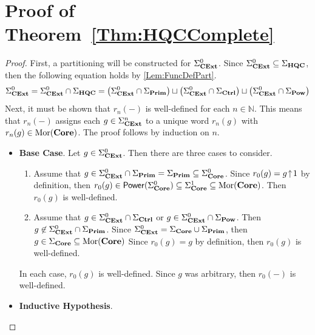 \section{Proof of Theorem~\ref{Thm:HQCComplete}}

\begin{proof}
    First, a partitioning will be constructed for $\Sigma_{\mathbf{CExt}}^0$.
    Since $\Sigma_{\mathbf{CExt}}^0 \subseteq \Sigma_{\mathbf{HQC}}$, then the following equation holds by \cref{Lem:FuncDefPart}.
    \begin{equation*}
        \Sigma_{\mathbf{CExt}}^0
        =
        \Sigma_{\mathbf{CExt}}^0 \cap \Sigma_{\mathbf{HQC}}
        =
        \left( \Sigma_{\mathbf{CExt}}^0 \cap \Sigma_{\textbf{Prim}} \right)
        \sqcup
        \left( \Sigma_{\mathbf{CExt}}^0 \cap \Sigma_{\textbf{Ctrl}} \right)
        \sqcup
        \left( \Sigma_{\mathbf{CExt}}^0 \cap \Sigma_{\textbf{Pow}} \right)
    \end{equation*}
    Next, it must be shown that $r_n( - )$ is well-defined for each $n \in \mathbb{N}$.
    This means that $r_n( - )$ assigns each $g \in \Sigma_{\mathbf{CExt}}^n$ to a unique word $r_n( g )$ with $r_n( g ) \in \operatorname{Mor}( \mathbf{Core} )$.
    The proof follows by induction on $n$.
    \begin{itemize}
    \item \textbf{Base Case}.
          Let $g \in \Sigma_{\mathbf{CExt}}^0$.
          Then there are three cases to consider.
          \begin{enumerate}
          \item Assume that $g \in \Sigma_{\mathbf{CExt}}^0 \cap \Sigma_{\textbf{Prim}} = \Sigma_{\textbf{Prim}} \subseteq \Sigma_{\mathbf{Core}}^0$.
                Since $r_0( g ) = g \!\uparrow\! 1$ by definition, then $r_0( g ) \in \mathsf{Power}( \Sigma_{\mathbf{Core}}^0 ) \subseteq \Sigma_{\mathbf{Core}}^1 \subseteq \operatorname{Mor}( \mathbf{Core} )$.
                Then $r_0( g )$ is well-defined.
          \item Assume that $g \in \Sigma_{\mathbf{CExt}}^0 \cap \Sigma_{\textbf{Ctrl}}$ or $g \in \Sigma_{\mathbf{CExt}}^0 \cap \Sigma_{\textbf{Pow}}$.
                Then $g \not \in \Sigma_{\mathbf{CExt}}^0 \cap \Sigma_{\textbf{Prim}}$.
                Since $\Sigma_{\mathbf{CExt}}^0 = \Sigma_{\mathbf{Core}} \cup \Sigma_{\textbf{Prim}}$, then $g \in \Sigma_{\mathbf{Core}} \subseteq \operatorname{Mor}( \mathbf{Core} )$
                Since $r_0( g ) = g$ by definition, then $r_0( g )$ is well-defined.
          \end{enumerate}
          In each case, $r_0( g )$ is well-defined.
          Since $g$ was arbitrary, then $r_0( - )$ is well-defined.
    \item \textbf{Inductive Hypothesis}.

\end{itemize}
\end{proof}
